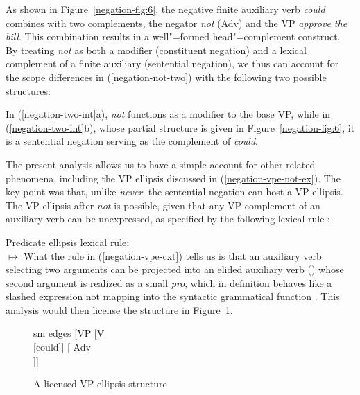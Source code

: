 \documentclass[output=paper
	        ,collection
	        ,collectionchapter
 	        ,biblatex
                ,babelshorthands
                ,newtxmath
                ,draftmode
                ,colorlinks, citecolor=brown
]{langscibook}
\begin{document}
\begin{exe}
\begin{xlist}
\begin{exe}
\begin{xlist}
As shown in Figure~\ref{negation-fig:6}, the negative finite auxiliary
verb \textit{could} combines with two complements, the negator
\textit{not} (Adv) and the VP \textit{approve the bill}.
This combination results in a well"=formed head"=complement construct.
By treating \textit{not} as both a modifier (constituent negation)
and a lexical complement of a finite auxiliary (sentential negation), we thus can
account for the scope differences in (\ref{negation-not-two}) with the
following two possible structures:

\eal
\label{negation-two-int}
\zl
%
In (\ref{negation-two-int}a), \textit{not} functions as a modifier to
the base VP, while  in (\ref{negation-two-int}b), whose partial structure is
given in Figure~\ref{negation-fig:6}, it is a sentential
negation serving as the complement of \emph{could}.

The present analysis allows us to have a simple account for other related phenomena,
including the VP ellipsis discussed in (\ref{negation-vpe-not-ex}). The key point
was that, unlike \textit{never}, the sentential negation can
host a VP ellipsis.  The VP ellipsis after \textit{not} is
possible, given that any VP complement of an auxiliary
verb can be unexpressed, as
specified by the following lexical rule \parencites{Kim:00}[]{kimmichaelis:2020}:


\ea
\label{negation-vpe-cxt}
Predicate ellipsis lexical rule:\\
  $\mapsto$
\z
%
%
What the rule in (\ref{negation-vpe-cxt}) tells us is that an auxiliary verb selecting two arguments
can be projected into an elided auxiliary verb () whose second argument
is realized as a small \emph{pro}, which in definition
behaves like a slashed expression not mapping into the syntactic grammatical
 function \COMPS. This analysis would then license
the structure in Figure~\ref{negation-could-not}.
%
%
%
%
\begin{figure}
	\begin{forest}
		sm edges
		[VP
			[V\\
					[could]]
			[ Adv\\
					[not]]]
	\end{forest}
\caption{A licensed VP ellipsis structure}\label{negation-could-not}
\end{figure}


\end{xlist}
\end{exe}
\end{xlist}
\end{exe}
\end{document}
